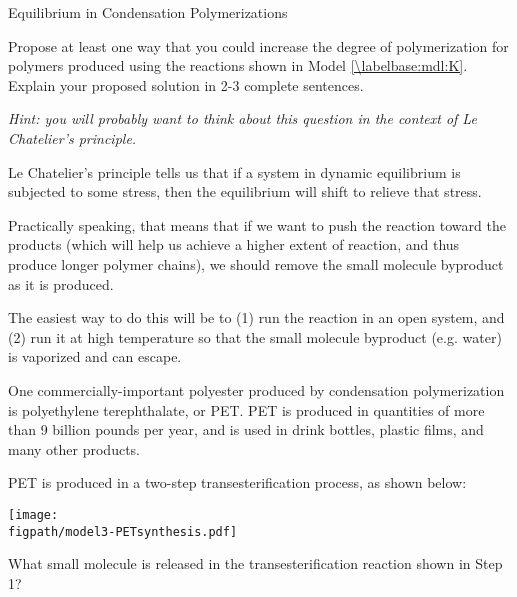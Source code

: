 \begin{activity}{Equilibrium in Condensation Polymerizations}
\begin{ctqs}
\begin{solution}[2in]
			\end{solution}
			
		\question Propose at least one way that you could increase the degree of polymerization for polymers produced using the reactions shown in Model \ref{\labelbase:mdl:K}.  Explain your proposed solution in 2-3 complete sentences.
		
			\emph{Hint: you will probably want to think about this question in the context of Le Chatelier's principle.}
		
			\begin{solution}[2.5in]
			
				Le Chatelier's principle tells us that if a system in dynamic equilibrium is subjected to some stress, then the equilibrium will shift to relieve that stress.
				
				Practically speaking, that means that if we want to push the reaction toward the products (which will help us achieve a higher extent of reaction, and thus produce longer polymer chains), we should remove the small molecule byproduct as it is produced.
				
				The easiest way to do this will be to (1) run the reaction in an open system, and (2) run it at high temperature so that the small molecule byproduct (e.g. water) is vaporized and can escape.
			
			\end{solution}
		
\end{ctqs}

\clearpage
\begin{model}
\label{\labelbase:mdl:PET}

One commercially-important polyester produced by condensation polymerization is polyethylene terephthalate, or PET.
PET is produced in quantities of more than 9 billion pounds per year, and is used in drink bottles, plastic films, and many other products.

PET is produced in a two-step transesterification process, as shown below:
	
		\vspace{0.1in}
		\centerline{\texttt{[image: \\figpath/model3-PETsynthesis.pdf]}}

\end{model}

\begin{ctqs}
		

			
		\question What small molecule is released in the transesterification reaction shown in Step 1?
		

\end{ctqs}
\end{activity}
